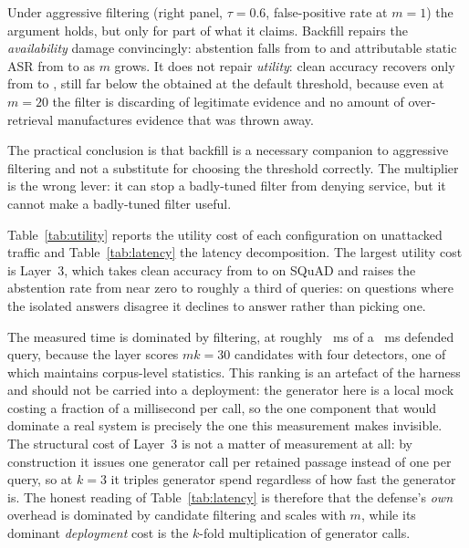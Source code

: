 Under aggressive filtering (right panel, $\tau = 0.6$, false-positive rate
\backfillStrictFprLo{} at $m=1$) the argument holds, but only for part of what it claims.
Backfill repairs the \emph{availability} damage convincingly: abstention falls from
\backfillStrictAbstainLo{} to \backfillStrictAbstainHi{} and attributable static ASR from
\backfillStrictAsrLo{} to \backfillStrictAsrHi{} as $m$ grows. It does not repair
\emph{utility}: clean accuracy recovers only from \backfillStrictAccLo{} to
\backfillStrictAccHi{}, still far below the \backfillDefaultAccHi{} obtained at the default
threshold, because even at $m=20$ the filter is discarding \backfillStrictFprHi{} of legitimate
evidence and no amount of over-retrieval manufactures evidence that was thrown away.

The practical conclusion is that backfill is a necessary companion to aggressive filtering and
not a substitute for choosing the threshold correctly. The multiplier is the wrong lever: it can
stop a badly-tuned filter from denying service, but it cannot make a badly-tuned filter useful.

Table~\ref{tab:utility} reports the utility cost of each configuration on unattacked traffic and
Table~\ref{tab:latency} the latency decomposition. The largest utility cost is Layer~3, which
takes clean accuracy from \cleanAccSquadnone{} to \cleanAccSquadLThree{} on SQuAD and raises the
abstention rate from near zero to roughly a third of queries: on questions where the isolated
answers disagree it declines to answer rather than picking one.

The measured time is dominated by filtering, at roughly \filterMsFullSquad{}~ms of a
\meanMsFullSquad{}~ms defended query, because the layer scores $mk = 30$ candidates with four
detectors, one of which maintains corpus-level statistics. This ranking is an artefact of the
harness and should not be carried into a deployment: the generator here is a local mock costing
a fraction of a millisecond per call, so the one component that would dominate a real system is
precisely the one this measurement makes invisible. The structural cost of Layer~3 is not a
matter of measurement at all: by construction it issues one generator call per retained
passage instead of one per query, so at $k=3$ it triples generator spend regardless of how fast
the generator is. The honest reading of Table~\ref{tab:latency} is therefore that the defense's
\emph{own} overhead is dominated by candidate filtering and scales with $m$, while its dominant
\emph{deployment} cost is the $k$-fold multiplication of generator calls.

